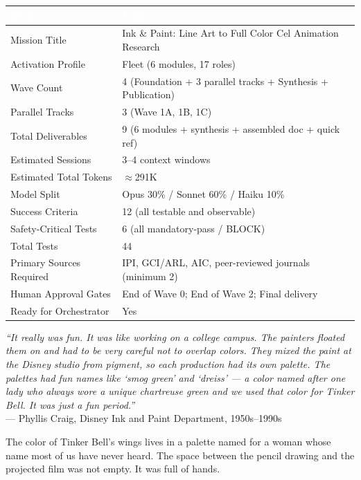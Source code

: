 \documentclass[11pt,letterpaper]{article}
\newcommand{\tableheader}[1]{\textbf{\sffamily\textcolor{white}{#1}}}
\begin{document}
\begin{center}
\begin{tabularx}{\textwidth}{L{5cm}X}
\toprule
{}
\tableheader{Metric} & \tableheader{Value} \\
\midrule
Mission Title & Ink \& Paint: Line Art to Full Color Cel Animation Research \\
Activation Profile & Fleet (6 modules, 17 roles) \\
Wave Count & 4 (Foundation + 3 parallel tracks + Synthesis + Publication) \\
Parallel Tracks & 3 (Wave 1A, 1B, 1C) \\
Total Deliverables & 9 (6 modules + synthesis + assembled doc + quick ref) \\
Estimated Sessions & 3--4 context windows \\
Estimated Total Tokens & $\approx$291K \\
Model Split & Opus 30\% / Sonnet 60\% / Haiku 10\% \\
Success Criteria & 12 (all testable and observable) \\
Safety-Critical Tests & 6 (all mandatory-pass / BLOCK) \\
Total Tests & 44 \\
Primary Sources Required & IPI, GCI/ARL, AIC, peer-reviewed journals (minimum 2) \\
Human Approval Gates & End of Wave 0; End of Wave 2; Final delivery \\
Ready for Orchestrator & Yes \\
\bottomrule
\end{tabularx}
\end{center}

\vspace{2em}

\begin{quotebox}
\textit{``It really was fun. It was like working on a college campus. The painters floated them on and had to be very careful not to overlap colors. They mixed the paint at the Disney studio from pigment, so each production had its own palette. The palettes had fun names like `smog green' and `dreiss' --- a color named after one lady who always wore a unique chartreuse green and we used that color for Tinker Bell. It was just a fun period.''} \\[0.5em]
\hspace*{2em}--- Phyllis Craig, Disney Ink and Paint Department, 1950s--1990s

\vspace{0.8em}
\noindent The color of Tinker Bell's wings lives in a palette named for a woman whose name most of us have never heard. The space between the pencil drawing and the projected film was not empty. It was full of hands.
\end{quotebox}
\end{document}
